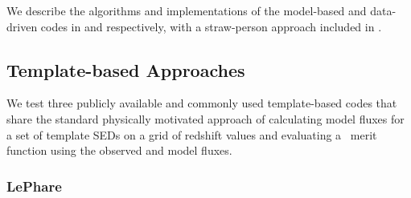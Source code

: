 We describe the algorithms and implementations of the model-based and data-driven codes in  and  respectively, with a straw-person approach included in .
%
%

\subsection{Template-based Approaches}

We test three publicly available and commonly used template-based codes that share the standard physically motivated approach of calculating model fluxes for a set of template SEDs on a grid of redshift values and evaluating a \chisq\ merit function using the observed and model fluxes.

\subsubsection{LePhare}

